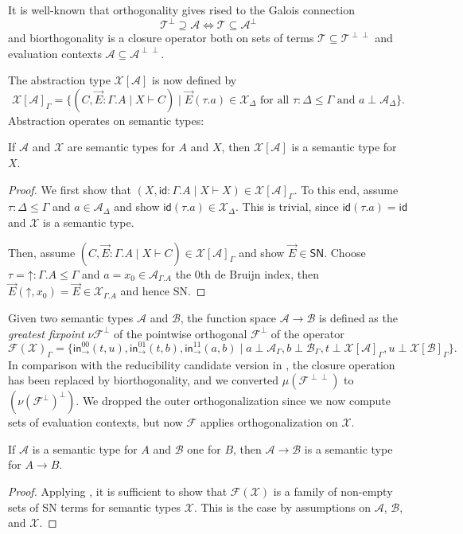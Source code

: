 \documentclass[a4paper,USenglish,cleveref, autoref, thm-restate]{lipics-v2019}
\newcommand{\tid}{\mathsf{id}}
\newcommand{\tin}{\ensuremath{\mathsf{in}}}
\newcommand{\inn}[2]{\tin_{#1}^{#2}}
\newcommand{\A}{\mathcal{A}}
\newcommand{\B}{\mathcal{B}}
\newcommand{\F}{\mathcal{F}}
\newcommand{\T}{\mathcal{T}}
\newcommand{\X}{\mathcal{X}}
\newcommand{\SN}{\mathsf{SN}}
\newcommand{\up}{\mathord{\uparrow}}
\begin{document}
It is well-known that orthogonality gives rised to the Galois
connection
\[
  \T^\perp \supseteq \A \iff \T \subseteq \A^\perp
\]
and biorthogonality is a closure operator both on sets of terms $\T
\subseteq \T^{\perp\perp}$ and evaluation contexts
$\A \subseteq \A^{\perp\perp}$.

The abstraction type $\X[\A]$ is now defined by
\[
  \X[\A]_\Gamma =
  \{ (C, \vec E : \Gamma.A \mid X \vdash C)
     \mid \vec E (\tau.a) \in \X_\Delta
     \mbox{ for all } \tau : \Delta \leq \Gamma
     \mbox{ and } a \perp \A_\Delta
  \}
  .
\]
Abstraction operates on semantic types:
\begin{lemma}
  \label{lem:absrev}
  If $\A$ and $\X$ are semantic types for $A$ and $X$, then $\X[\A]$
  is a semantic type for $X$.
\end{lemma}
\begin{proof}
  We first show that
  $(X,\tid : \Gamma.A \mid X \vdash X) \in \X[\A]_\Gamma$.
  To this end, assume $\tau : \Delta \leq \Gamma$ and $a \in
  \A_\Delta$ and show $\tid(\tau.a) \in \X_\Delta$.  This is trivial,
  since $\tid(\tau.a) = \tid$ and $\X$ is a semantic type.

  Then, assume $(C, \vec E : \Gamma.A \mid X \vdash C) \in
  \X[\A]_\Gamma$ and show $\vec E \in \SN$.
  Choose $\tau = \up : \Gamma.A \leq \Gamma$ and $a = x_0 \in
  \A_{\Gamma.A}$ the 0th de Bruijn index, then $\vec E (\up,x_0) =
  \vec E \in \X_{\Gamma.A}$ and hence SN.
\end{proof}
Given two semantic types $\A$ and $\B$, the function space $\A \to \B$
is defined as the \emph{greatest fixpoint} $\nu \F^\perp$ of the
pointwise orthogonal $\F^\perp$ of the operator
\[
  \F(\X)_\Gamma =
  \{
    \inn\to{00}(t,u),
    \inn\to{01}(t,b),
    \inn\to{11}(a,b) \mid
      a \perp \A_\Gamma,
      b \perp \B_\Gamma,
      t \perp \X[\A]_\Gamma,
      u \perp \X[\B]_\Gamma
  \}
  .
\]
In comparison with the reducibility candidate version in
, the closure operation has been replaced by
biorthogonality, and we converted $\mu(\F^{\perp\perp})$
to $(\nu(\F^\perp)^\perp)$.  We dropped the outer orthogonalization since
we now compute sets of evaluation contexts, but now $\F$ applies
orthogonalization on $\X$.

\begin{lemma}
  \label{lem:funrev}
  If $\A$ is a semantic type for $A$ and $\B$ one for $B$, then $\A
  \to \B$ is a semantic type for $A \to B$.
\end{lemma}
\begin{proof}
  Applying ,
  it is sufficient to show that $\F(\X)$ is a family of non-empty sets
  of SN terms for semantic types $\X$.
  This is the case by assumptions on $\A$, $\B$, and $\X$.
\end{proof}
\end{document}
